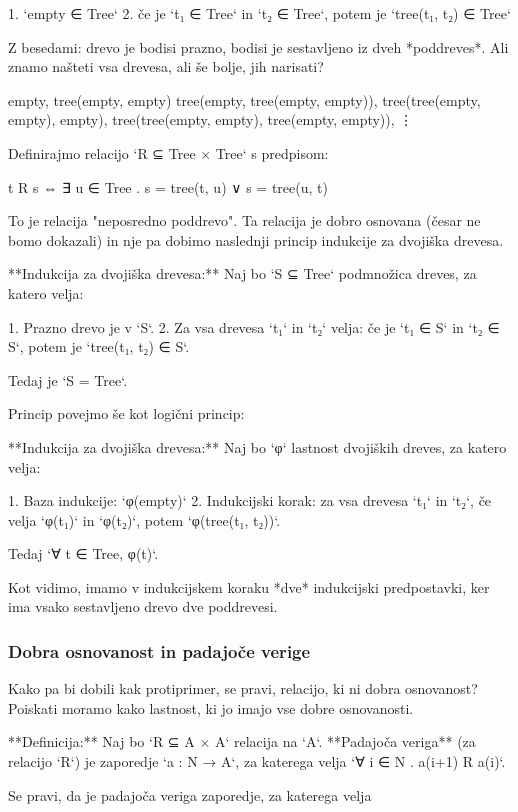 1. `empty ∈ Tree`
2. če je `t₁ ∈ Tree` in `t₂ ∈ Tree`, potem je `tree(t₁, t₂) ∈ Tree`

Z besedami: drevo je bodisi prazno, bodisi je sestavljeno iz dveh *poddreves*. Ali znamo
našteti vsa drevesa, ali še bolje, jih narisati?

    empty,
    tree(empty, empty)
    tree(empty, tree(empty, empty)),
    tree(tree(empty, empty), empty),
    tree(tree(empty, empty), tree(empty, empty)),
    ⋮

Definirajmo relacijo `R ⊆ Tree × Tree` s predpisom:

    t R s ⇔ ∃ u ∈ Tree . s = tree(t, u) ∨ s = tree(u, t)

To je relacija "neposredno poddrevo". Ta relacija je dobro osnovana (česar ne bomo
dokazali) in nje pa dobimo naslednji princip indukcije za dvojiška drevesa.

**Indukcija za dvojiška drevesa:** Naj bo `S ⊆ Tree` podmnožica dreves, za katero velja:

1. Prazno drevo je v `S`.
2. Za vsa drevesa `t₁` in `t₂` velja: če je `t₁ ∈ S` in `t₂ ∈ S`, potem je `tree(t₁, t₂) ∈ S`.

Tedaj je `S = Tree`.

Princip povejmo še kot logični princip:

**Indukcija za dvojiška drevesa:** Naj bo `φ` lastnost dvojiških dreves, za katero velja:

1. Baza indukcije: `φ(empty)`
2. Indukcijski korak: za vsa drevesa `t₁` in `t₂`, če velja `φ(t₁)` in `φ(t₂)`, potem
   `φ(tree(t₁, t₂))`.

Tedaj `∀ t ∈ Tree, φ(t)`.

Kot vidimo, imamo v indukcijskem koraku *dve* indukcijski predpostavki, ker ima vsako
sestavljeno drevo dve poddrevesi.


\subsubsection{Dobra osnovanost in padajoče verige}

Kako pa bi dobili kak protiprimer, se pravi, relacijo, ki ni dobra osnovanost? Poiskati
moramo kako lastnost, ki jo imajo vse dobre osnovanosti.

**Definicija:** Naj bo `R ⊆ A × A` relacija na `A`. **Padajoča veriga** (za relacijo `R`)
je zaporedje `a : N → A`, za katerega velja `∀ i ∈ N . a(i+1) R a(i)`.

Se pravi, da je padajoča veriga zaporedje, za katerega velja

